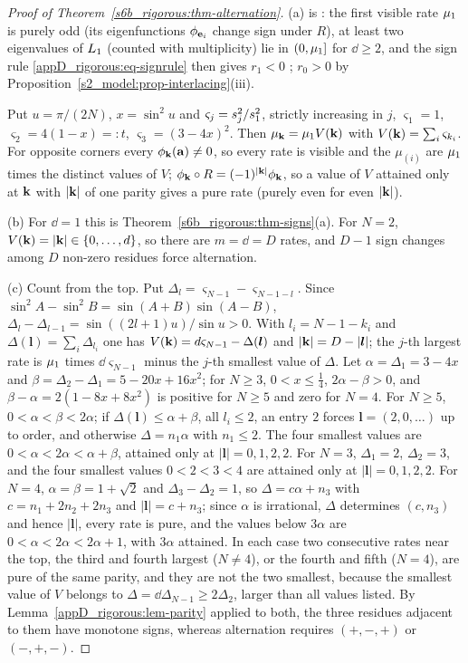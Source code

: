 \begin{proof}[Proof of Theorem~\ref{s6b_rigorous:thm-alternation}]
(a) is : the first visible rate $\mu_{1}$ is purely odd (its eigenfunctions $\phi_{\mathbf{e}_i}$ change sign
under $R$), at least two eigenvalues of $L_1$ (counted with multiplicity) lie in $(0,\mu_{1}]$ for $\dd\ge2$, and
the sign rule \eqref{appD_rigorous:eq-signrule} then gives $r_1<0$ ; $r_0>0$ by
Proposition~\ref{s2_model:prop-interlacing}(iii).

 Put $u=\pi/(2N)$, $x=\sin^{2}u$ and $\varsigma_j=s_{j}^{2}/s_{1}^{2}$, strictly increasing in $j$,
$\varsigma_1=1$, $\varsigma_2=4(1-x)=:t$, $\varsigma_3=(3-4x)^{2}$. Then $\mu_{\mathbf{k}}=\mu_{1} V(\mathbf{k})$ with
$V(\mathbf{k})=\sum_i\varsigma_{k_i}$. For opposite corners every $\phi_{\mathbf{k}}(\mathbf{a})\ne0$, so every rate is visible and the
$\mu_{(i)}$ are $\mu_{1}$ times the distinct values of $V$; $\phi_{\mathbf{k}}\circ R=(-1)^{|\mathbf{k}|}\phi_{\mathbf{k}}$, so a value of
$V$ attained only at $\mathbf{k}$ with $|\mathbf{k}|$ of one parity gives a pure rate (purely even for even $|\mathbf{k}|$).

(b) For $\dd=1$ this is Theorem~\ref{s6b_rigorous:thm-signs}(a). For $N=2$, $V(\mathbf{k})=|\mathbf{k}|\in\{0,\dots,d\}$, so there
are $m=\dd=D$ rates, and $D-1$ sign changes among $D$ non-zero residues force alternation.

(c) Count from the top. Put $\Delta_l=\varsigma_{N-1}-\varsigma_{N-1-l}$. Since $\sin^{2}A-\sin^{2}B=\sin(A+B)\sin(A-B)$,
$\Delta_l-\Delta_{l-1}=\sin((2l+1)u)/\sin u>0$. With $l_i=N-1-k_i$ and $\Delta(\boldsymbol l)=\sum_i\Delta_{l_i}$ one has
$V(\mathbf{k})=d\varsigma_{N-1}-\Delta(\boldsymbol l)$ and $|\mathbf{k}|=D-|\boldsymbol l|$; the $j$-th largest rate is $\mu_{1}$
times $\dd\varsigma_{N-1}$ minus the $j$-th smallest value of $\Delta$. Let $\alpha=\Delta_1=3-4x$ and
$\beta=\Delta_2-\Delta_1=5-20x+16x^{2}$; for $N\ge3$, $0<x\le\frac14$, $2\alpha-\beta>0$, and $\beta-\alpha=2(1-8x+8x^{2})$
is positive for $N\ge5$ and zero for $N=4$.
For $N\ge5$, $0<\alpha<\beta<2\alpha$; if $\Delta(\boldsymbol l)\le\alpha+\beta$, all $l_i\le2$, an entry $2$ forces
$\boldsymbol l=(2,0,\dots)$ up to order, and otherwise $\Delta=n_1\alpha$ with $n_1\le2$. The four smallest values are
$0<\alpha<2\alpha<\alpha+\beta$, attained only at $|\boldsymbol l|=0,1,2,2$. For $N=3$, $\Delta_1=2$, $\Delta_2=3$, and the
four smallest values $0<2<3<4$ are attained only at $|\boldsymbol l|=0,1,2,2$. For $N=4$, $\alpha=\beta=1+\sqrt2$ and
$\Delta_3-\Delta_2=1$, so $\Delta=c\alpha+n_3$ with $c=n_1+2n_2+2n_3$ and $|\boldsymbol l|=c+n_3$; since $\alpha$ is
irrational, $\Delta$ determines $(c,n_3)$ and hence $|\boldsymbol l|$, every rate is pure, and the values below $3\alpha$
are $0<\alpha<2\alpha<2\alpha+1$, with $3\alpha$ attained. In each case two consecutive rates near the top, the third
and fourth largest ($N\ne4$), or the fourth and fifth ($N=4$), are pure of the same parity, and they are not the two
smallest, because the smallest value of $V$ belongs to $\Delta=\dd\Delta_{N-1}\ge2\Delta_2$, larger than all values
listed. By Lemma~\ref{appD_rigorous:lem-parity} applied to both, the three residues adjacent to them have monotone
signs, whereas alternation requires $(+,-,+)$ or $(-,+,-)$.
\end{proof}


